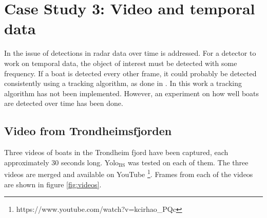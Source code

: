 \newpage

\section{Case Study 3: Video and temporal data}
In \citep{Bohn2018} the issue of detections in radar data over time is addressed. For a detector to work on temporal data, the object of interest must be detected with some frequency. If a boat is detected every other frame, it could probably be detected consistently using a tracking algorithm, as done in \citep{Markov}. In this work a tracking algorithm has not been implemented. However, an experiment on how well boats are detected over time has been done.

\subsection{Video from Trondheimsfjorden}

Three videos of boats in the Trondheim fjord have been captured, each approximately 30 seconds long. Yolo$_{\text{BS}}$ was tested on each of them. The three videos are merged and available on YouTube \footnote{https://www.youtube.com/watch?v=kcirhao\_PQc}. Frames from each of the videos are shown in figure \ref{fig:videos}.

